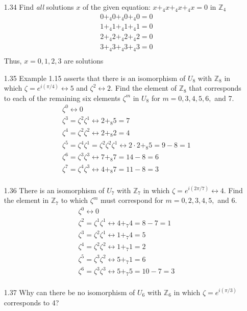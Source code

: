 \documentclass[12pt]{article}
\newcommand{\Z}{\mathds{Z}}
\begin{document}
\begin{enumerate}
	\item[1.34] Find \textit{all} solutions $x$ of the given equation: \quad $x+_4x+_4x+_4x=0$ in $\Z_4$
		\begin{align*}
			0+_4 0+_4 0+_4 0 = 0 \\
			1+_4 1+_4 1+_4 1 = 0 \\
			2+_4 2+_4 2+_4 2 = 0 \\
			3+_4 3+_4 3+_4 3 = 0 \\
		\end{align*}
		Thus, $x = 0,1,2,3$ are solutions
	\item[1.35] Example 1.15 asserts that there is an isomorphism of $U_8$ with $\Z_8$ in which $\zeta = e^{i(\pi/4)} \leftrightarrow 5$ and $\zeta^2 \leftrightarrow 2$. Find the element of $\Z_8$ that corresponds to each of the remaining six elements $\zeta^m$ in $U_8$ for $m=0,3,4,5,6,$ and 7.
		$$\begin{aligned}
			\zeta^0 \leftrightarrow 0\\
			\zeta^3 = \zeta^2\zeta^1 \leftrightarrow 2+_8 5 = 7\\
			\zeta^4 = \zeta^2\zeta^2 \leftrightarrow 2+_8 2 = 4\\
			\zeta^5 = \zeta^4\zeta^1 = \zeta^2\zeta^2\zeta^1 \leftrightarrow 2\cdot 2+_8 5 = 9 -8=1\\
			\zeta^6 = \zeta^3\zeta^3 \leftrightarrow 7+_8 7 = 14 - 8 = 6\\
			\zeta^7 = \zeta^4\zeta^3 \leftrightarrow 4+_8 7 = 11 - 8 = 3\\
		\end{aligned}$$
	\item[1.36] There is an isomorphism of $U_7$ with $\Z_7$ in which $\zeta = e^{i(2\pi/7)} \leftrightarrow 4$. Find the element in $\Z_7$ to which $\zeta^m$ must correspond for $m=0,2,3,4,5,$ and 6.
		$$\begin{aligned}
		\zeta^0 \leftrightarrow 0\\
		\zeta^2 = \zeta^1\zeta^1 \leftrightarrow 4+_7 4 = 8 - 7 = 1\\
		\zeta^3 = \zeta^2\zeta^1 \leftrightarrow 1+_7 4 = 5\\
		\zeta^4 = \zeta^2\zeta^2 \leftrightarrow 1+_7 1 = 2\\
		\zeta^5 = \zeta^3\zeta^2 \leftrightarrow 5+_7 1 = 6\\
		\zeta^6 = \zeta^3\zeta^3 \leftrightarrow 5+_7 5 = 10 - 7 = 3\\
		\end{aligned}$$
	\item[1.37] Why can there be no isomorphism of $U_6$ with $\Z_6$ in which $\zeta=e^{i(\pi/3)}$ corresponds to 4?\\

\end{enumerate}
\end{document}
